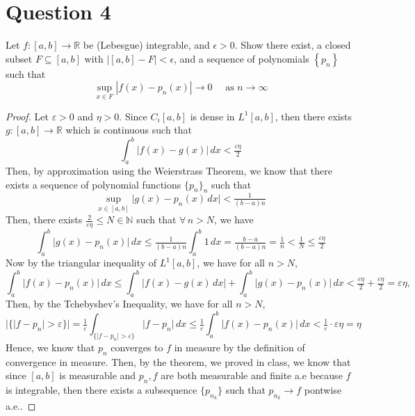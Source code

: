 \section{Question 4}

\begin{question}
    [15 points] Let $f:[a, b] \rightarrow \mathbb{R}$ be (Lebesgue) integrable, and $\epsilon>0$. Show there exist, a closed subset $F \subseteq[a, b]$ with $|[a, b]-F|<\epsilon$, and a sequence of polynomials $\left\{p_n\right\}$ such that
    $$
    \sup _{x \in F}\left|f(x)-p_n(x)\right| \rightarrow 0 \quad \text { as } n \rightarrow \infty
    $$
\end{question}

\begin{answer}
    \begin{proof}
        Let $\varepsilon > 0$ and $\eta > 0$. Since $C_i[a,b]$ is dense in $L^1[a,b]$, then there exists $g: [a,b] \to \mathbb{R}$ which is continuous such that
        \begin{equation}
            \int_a^b \lvert f(x) - g(x) \rvert \,dx < \tfrac{\varepsilon \eta}{2}
        \end{equation}
        Then, by approximation using the Weierstrass Theorem, we know that there exists a sequence of polynomial functions $\{p_n\}_n$ such that
        \begin{equation}
            \sup_{x \in [a,b]} \lvert g(x) - p_n(x) \,dx \rvert < \tfrac{1}{(b-a)n}
        \end{equation}
        Then, there exists $\tfrac{2}{\varepsilon\eta} \leq N \in \mathbb{N}$ such that $\forall \, n > N$, we have
        \begin{equation}
            \int_a^b \lvert g(x) - p_n(x) \rvert \,dx \leq \tfrac{1}{(b-a)n} \int_a^b 1\,dx = \tfrac{b-a}{(b-a)n} = \tfrac{1}{n} < \tfrac{1}{N} \leq \tfrac{\varepsilon\eta}{2}
        \end{equation}
        Now by the triangular inequality of $L^1[a,b]$, we have for all $n > N$,
        \begin{equation}
            \int_a^b \lvert f(x) - p_n(x) \rvert \,dx \leq \int_a^b \lvert f(x) - g(x) \,dx \rvert + \int_a^b \lvert g(x) - p_n(x) \rvert \,dx < \tfrac{\varepsilon\eta}{2} + \tfrac{\varepsilon\eta}{2} = \varepsilon\eta,
        \end{equation}
        Then, by the Tchebyshev’s Inequality, we have for all $n > N$,
        \begin{equation}
            \lvert \{\lvert f - p_n \rvert > \varepsilon\} \rvert = \tfrac{1}{\varepsilon}\int_{\{\lvert f - p_n \rvert > \varepsilon \}} \lvert f - p_n \rvert \,dx \leq \tfrac{1}{\varepsilon}\int_a^b \lvert f(x) - p_n(x) \rvert \,dx < \tfrac{1}{\varepsilon}\cdot\varepsilon\eta = \eta
        \end{equation}
        Hence, we know that $p_n$ converges to $f$ in measure by the definition of convergence in measure. Then, by the theorem, we proved in class, we know that since $[a,b]$ is measurable and $p_n, f$ are both measurable and finite a.e because $f$ is integrable, then there exists a subsequence $\{p_{n_k}\}$ such that $p_{n_k} \to f$ pontwise a.e..
        

\end{proof}
\end{answer}
